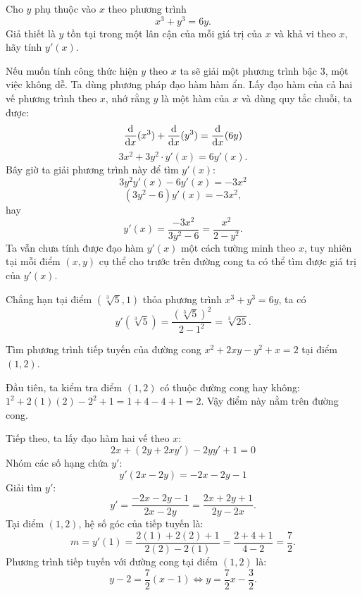 \begin{example}
    Cho $y$ phụ thuộc vào $x$ theo phương trình
    \[ x^3 + y^3 = 6y. \]
    Giả thiết là $y$ tồn tại trong một lân cận của mỗi giá trị của $x$ và khả vi theo $x$, hãy tính $y'(x)$.

    \begin{solution}
        Nếu muốn tính công thức hiện $y$ theo $x$ ta sẽ giải một phương trình bậc 3, một việc không dễ. Ta dùng phương pháp đạo hàm hàm ẩn. Lấy đạo hàm của cả hai vế phương trình theo $x$, nhớ rằng $y$ là một hàm của $x$ và dùng quy tắc chuỗi, ta được:
        \[ \frac{\mathrm{d}}{\mathrm{d}x}(x^3) + \frac{\mathrm{d}}{\mathrm{d}x}(y^3) = \frac{\mathrm{d}}{\mathrm{d}x}(6y) \]
        \[ 3x^2 + 3y^2 \cdot y'(x) = 6y'(x). \]
        Bây giờ ta giải phương trình này để tìm $y'(x)$:
        \[ 3y^2y'(x) - 6y'(x) = -3x^2 \]
        \[ (3y^2-6)y'(x) = -3x^2, \]
        hay
        \[ y'(x) = \dfrac{-3x^2}{3y^2 - 6} = \dfrac{x^2}{2-y^2}. \]
        Ta vẫn chưa tính được đạo hàm $y'(x)$ một cách tường minh theo $x$, tuy nhiên tại mỗi điểm $(x, y)$ cụ thể cho trước trên đường cong ta có thể tìm được giá trị của $y'(x)$.

        Chẳng hạn tại điểm $(\sqrt[3]{5}, 1)$ thỏa phương trình $x^3 + y^3 = 6y$, ta có
        \[ y'(\sqrt[3]{5}) = \dfrac{(\sqrt[3]{5})^2}{2 - 1^2} = \sqrt[3]{25}. \]
    \end{solution}
\end{example}

\begin{example}
    Tìm phương trình tiếp tuyến của đường cong $x^2 + 2xy - y^2 + x = 2$ tại điểm $(1, 2)$.

    \begin{solution}
        Đầu tiên, ta kiểm tra điểm $(1,2)$ có thuộc đường cong hay không: $1^2 + 2(1)(2) - 2^2 + 1 = 1 + 4 - 4 + 1 = 2$. Vậy điểm này nằm trên đường cong.

        Tiếp theo, ta lấy đạo hàm hai vế theo $x$:
        \[ 2x + (2y + 2xy') - 2yy' + 1 = 0 \]
        Nhóm các số hạng chứa $y'$:
        \[ y'(2x - 2y) = -2x - 2y - 1 \]
        Giải tìm $y'$:
        \[ y' = \dfrac{-2x - 2y - 1}{2x - 2y} = \dfrac{2x + 2y + 1}{2y - 2x}. \]
        Tại điểm $(1, 2)$, hệ số góc của tiếp tuyến là:
        \[ m = y'(1) = \dfrac{2(1) + 2(2) + 1}{2(2) - 2(1)} = \dfrac{2+4+1}{4-2} = \dfrac{7}{2}. \]
        Phương trình tiếp tuyến với đường cong tại điểm $(1, 2)$ là:
        \[ y - 2 = \dfrac{7}{2}(x-1) \iff y = \dfrac{7}{2}x - \dfrac{3}{2}. \]
    \end{solution}
\end{example}

